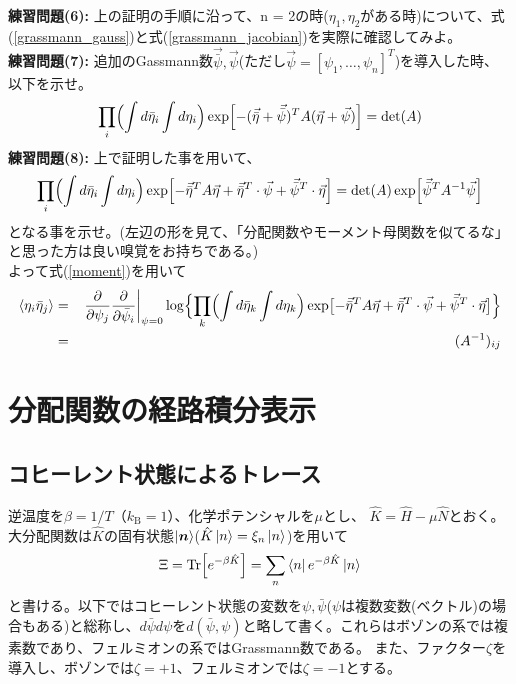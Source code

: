 \documentclass[a4paper,12pt]{jsarticle}
\newcommand{\p}{\partial}
\begin{document}
\begin{mdframed}[linewidth=1pt]
\textbf{練習問題(6):} 上の証明の手順に沿って、n = 2の時($\eta_1, \eta_2$がある時)について、式(\ref{grassmann_gauss})と式(\ref{grassmann_jacobian})を実際に確認してみよ。\\
\textbf{練習問題(7):} 追加のGassmann数$\vec{\bar{\psi}}, \vec{\psi}$(ただし$\vec{\psi} = [\psi_1, \dots, \psi_n]^T$)を導入した時、以下を示せ。
\begin{eqnarray}
  \prod_i \Bigl(\int d\bar{\eta}_i \int d\eta_i\Bigr) \exp[-(\vec{\bar{\eta}}+\vec{\bar{\psi}})^T A (\vec{\eta} + \vec{\psi}) ] = \det(A)
\end{eqnarray}
\textbf{練習問題(8):} 上で証明した事を用いて、
\begin{eqnarray}
  \prod_i \Bigl(\int d\bar{\eta}_i \int d\eta_i\Bigr) \exp[-\vec{\bar{\eta}}^T A \vec{\eta} + \vec{\bar{\eta}}^T\cdot\vec{\psi} + \vec{\bar{\psi}}^T\cdot\vec{\eta}] = \det(A)\exp[\vec{\bar{\psi}}^T A^{-1} \vec{\psi}]\nonumber\\
  \label{moment}
\end{eqnarray}
となる事を示せ。(左辺の形を見て、「分配関数やモーメント母関数を似てるな」と思った方は良い嗅覚をお持ちである。)\\
よって式(\ref{moment})を用いて
\begin{eqnarray}
  \ev{\eta_i\bar{\eta}_j} &=& \left.\frac{\p}{\p\psi_j}\frac{\p}{\p\bar\psi_i}\right|_{\psi=0}\log\Bigl\{\prod_k \Bigl(\int d\bar{\eta}_k \int d\eta_k\Bigr) \exp\bigl[-\vec{\bar{\eta}}^T A \vec{\eta}+ \vec{\bar{\eta}}^T\cdot\vec{\psi} + \vec{\bar{\psi}}^T\cdot\vec{\eta}\bigr]\Bigr\}\nonumber\\
   &=& (A^{-1})_{ij}\label{Grassmann_Green}
\end{eqnarray}
\end{mdframed}

\section{分配関数の経路積分表示}

\subsection{コヒーレント状態によるトレース}
逆温度を$\beta=1/T$（$k_{\mathrm B}=1$）、化学ポテンシャルを$\mu$とし、
$\hat K=\hat H-\mu\hat N$とおく。大分配関数は$\hat{K}$の固有状態$\ket{\boldsymbol n}$($\hat{K}\ket{n} = \xi_n\ket{n}$)を用いて
\begin{equation}
  \Xi=\mathrm{Tr}\Bigl[e^{-\beta\hat K}\Bigr]
   =\sum_{n}\bra{n}e^{-\beta\hat K}\ket{n}
\end{equation}
と書ける。以下ではコヒーレント状態の変数を$\psi,\bar\psi$($\psi$は複数変数(ベクトル)の場合もある)と総称し、$d\bar\psi d\psi$を$d(\bar\psi,\psi)$と略して書く。これらはボゾンの系では複素数であり、フェルミオンの系ではGrassmann数である。
また、ファクター$\zeta$を導入し、ボゾンでは$\zeta=+1$、フェルミオンでは$\zeta=-1$とする。
\end{document}
